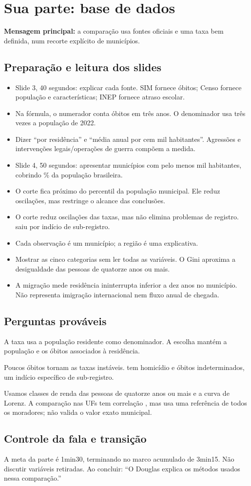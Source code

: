 \section{Sua parte: base de dados}
\textbf{Mensagem principal:} a comparação usa fontes oficiais e uma taxa bem definida, num recorte explícito de municípios.
\subsection{Preparação e leitura dos slides}
\begin{itemize}
\item Slide 3, 40 segundos: explicar cada fonte. SIM fornece óbitos; Censo fornece população e características; INEP fornece atraso escolar.
\item Na fórmula, o numerador conta óbitos em três anos. O denominador usa três vezes a população de 2022.
\item Dizer ``por residência'' e ``média anual por cem mil habitantes''. Agressões e intervenções legais/operações de guerra compõem a medida.
\item Slide 4, 50 segundos: apresentar \nMunEsc{} municípios com pelo menos \nPopMin{} mil habitantes, cobrindo \nPctPopEsc\% da população brasileira.
\item O corte fica próximo do percentil \nPercCorte{} da população municipal. Ele reduz oscilações, mas restringe o alcance das conclusões.
\item O corte reduz oscilações das taxas, mas não elimina problemas de registro. \nForaNome{} saiu por indício de sub-registro.
\item Cada observação é um município; a região é uma explicativa.
\item Mostrar as cinco categorias sem ler todas as variáveis. O Gini aproxima a desigualdade das pessoas de quatorze anos ou mais.
\item A migração mede residência ininterrupta inferior a dez anos no município. Não representa imigração internacional nem fluxo anual de chegada.
\end{itemize}
\subsection{Perguntas prováveis}
\begin{description}[leftmargin=0pt]
\item[Por que usar residência e não ocorrência?] A taxa usa a população residente como denominador. A escolha mantém a população e os óbitos associados à residência.
\item[Por que retirar cidades pequenas e \nForaNome?] Poucos óbitos tornam as taxas instáveis. \nForaNome{} tem \nForaHom{} homicídio e \nForaIndet{} óbitos indeterminados, um indício específico de sub-registro.
\item[Como calcularam o Gini municipal?] Usamos classes de renda das pessoas de quatorze anos ou mais e a curva de Lorenz. A comparação nas UFs tem correlação \nGiniCorUF, mas usa uma referência de todos os moradores; não valida o valor exato municipal.
\end{description}
\subsection{Controle da fala e transição}
A meta da parte é 1min30, terminando no marco acumulado de 3min15.
Não discutir variáveis retiradas. Ao concluir: ``O Douglas explica os métodos usados nessa comparação.''
